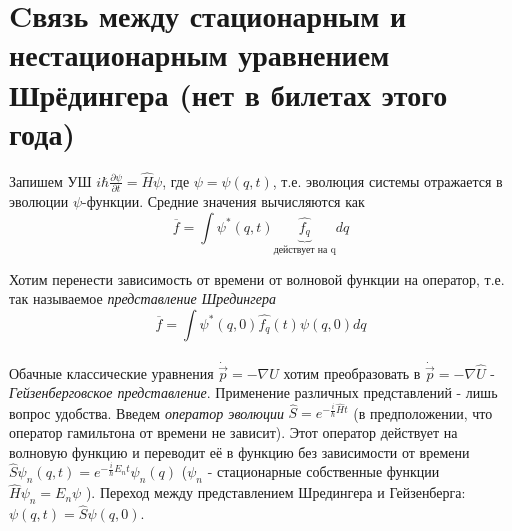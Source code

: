 \newpage
\chapter{Cвязь между стационарным и нестационарным уравнением Шрёдингера (нет в билетах этого года)}
\par Запишем УШ $i\hbar \frac{\partial \psi}{\partial t} = \hat{H}\psi$, где $\psi = \psi (q, t)$, т.е. эволюция системы отражается в эволюции $\psi$-функции. Средние значения вычисляются как
$$ \overline{f}=\int \psi^*(q, t)\underbrace{\hat{f_q}}_{\text{действует на q}}dq$$
\par Хотим перенести зависимость от времени от волновой функции на оператор, т.е. так называемое \textit{представление Шредингера}
$$  \overline{f}=\int \psi^*(q, 0)\hat{f_q}(t)\psi(q, 0)dq$$
\par Обачные классические уравнения $\dot{\vec{p}}=- \nabla U$ хотим преобразовать в $\hat{\dot{\vec{p}}} = - \nabla \hat{U} $  - \textit{Гейзенберговское представление}. Применение различных представлений - лишь вопрос удобства. Введем \textit{оператор эволюции} $\hat{S}=e^{-\frac{i}{\hbar} \hat{H}t}$ (в предположении, что оператор гамильтона от времени не зависит). Этот оператор действует на волновую функцию и переводит её в функцию без зависимости от времени $\hat{S}\psi_n(q, t)=e^{-\frac{i}{\hbar} E_n t} \psi_n (q)$ ($\psi_n$ - стационарные собственные функции $\hat{H}\psi_n = E_n \psi$ ). Переход между представлением Шредингера и Гейзенберга: $\psi(q, t)=\hat{S}\psi(q, 0) $.
